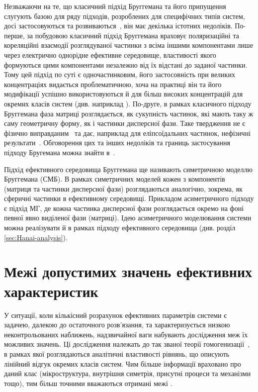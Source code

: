 \documentclass[14pt,twoside]{vakthesis}
\begin{document}
Незважаючи на те, що класичний підхід Бруггемана та його припущення слугують базою для ряду підходів, розроблених для специфічних типів систем, досі застосовуються та розвиваються~\cite{Choy,Stroud1998,Milton,Banheg1986}, він має декілька істотних недоліків.
По-перше, за побудовою класичний підхід Бруггемана враховує поляризаційні та кореляційні взаємодії розглядуваної частинки з всіма іншими компонентами лише через електрично однорідне ефективне середовище, властивості якого формуються цими компонентами незалежно від їх відстані до заданої частинки. Тому цей підхід по суті є одночастинковим, його застосовність при великих концентраціях видається проблематичною, хоча на практиці він та його модифікації успішно використовуються й для більш високих концентрацій для окремих класів систем (див. наприклад \cite{Wiec1994, Zhou2012, McLachlan1990}).
По-друге, в рамках класичного підходу Бруггемана фаза матриці розглядається, як сукупність частинок, які мають таку ж саму геометричну форму, як і частинки дисперсної фази. Таке твердження не є фізично виправданим~\cite{Chelidze} та дає, наприклад для еліпсоїдальних частинок, нефізичні результати~\cite{Brouers1986,Kirkpatrick1971,Torquato}.
Обговорення цих та інших недоліків та границь застосування підходу Бругемана можна знайти в~\cite{Torquato,Choy,Sihvola1999,Brosseau2006,Milton}.

Підхід ефективного середовища Бруггемана ще називають симетричною моделлю Бруггемана (СМБ). В рамках симетричних моделей кожен з компонентів (матриця та частинки дисперсної фази) розглядаються аналогічно, зокрема, як сферичні частинки в ефективному середовищі. Прикладом асиметричного підходу є підхід МГ, де кожна частинка дисперсної фази розглядається окремо на фоні певної явно виділеної фази (матриці).
Ідею асиметричного моделювання системи можна реалізувати й в рамках підходу ефективного середовища (див. розділ \ref{sec:Hanai-analysis}).


\section{Межі допустимих значень ефективних характеристик}\label{sec:HS}

У ситуації, коли кількісний розрахунок  ефективних параметрів системи є задачею, далекою до остаточного розв'язання, та характеризується низкою неконтрольованих наближень, надзвичайної ваги набувають дослідження меж їх можливих значень.
Ці дослідження належать до так званої теорії гомогенизації~\cite{Torquato,Milton,Sihvola1999,Jikov}, в рамках  якої розглядаються аналітичні властивості рівнянь, що описують лінійний відгук окремих класів систем.
Чим більше інформації враховано про даний клас (мікроструктура, внутрішня симетрія, присутні процеси та механізми тощо), тим  більш точними вважаються отримані межі \cite{Cule1999,Torquato}.
\end{document}
